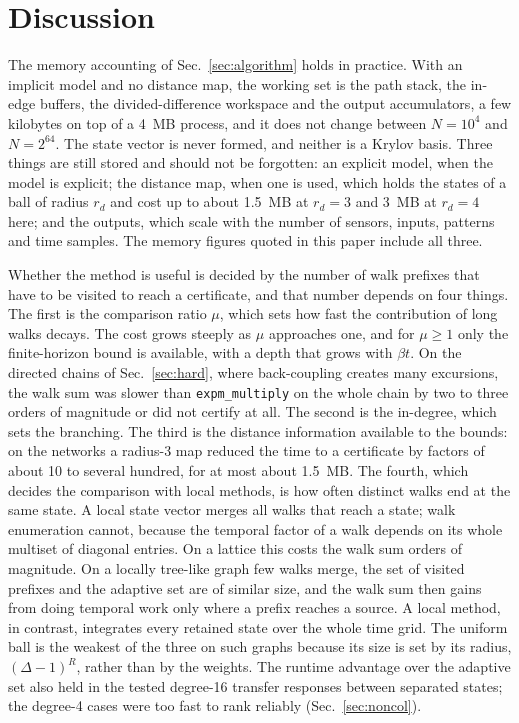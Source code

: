 \documentclass[aps,pra,superscriptaddress,floatfix,longbibliography,twocolumn]{revtex4-2}
\begin{document}
\section{Discussion}\label{sec:discussion}

The memory accounting of Sec.~\ref{sec:algorithm} holds in practice. With an implicit model and no distance map, the working set is the path stack, the in-edge buffers, the divided-difference workspace and the output accumulators, a few kilobytes on top of a 4~MB process, and it does not change between $N=10^4$ and $N=2^{64}$. The state vector is never formed, and neither is a Krylov basis. Three things are still stored and should not be forgotten: an explicit model, when the model is explicit; the distance map, when one is used, which holds the states of a ball of radius $r_d$ and cost up to about 1.5~MB at $r_d=3$ and 3~MB at $r_d=4$ here; and the outputs, which scale with the number of sensors, inputs, patterns and time samples. The memory figures quoted in this paper include all three.

Whether the method is useful is decided by the number of walk prefixes that have to be visited to reach a certificate, and that number depends on four things. The first is the comparison ratio $\mu$, which sets how fast the contribution of long walks decays. The cost grows steeply as $\mu$ approaches one, and for $\mu\ge1$ only the finite-horizon bound is available, with a depth that grows with $\beta t$. On the directed chains of Sec.~\ref{sec:hard}, where back-coupling creates many excursions, the walk sum was slower than \texttt{expm\_multiply} on the whole chain by two to three orders of magnitude or did not certify at all. The second is the in-degree, which sets the branching. The third is the distance information available to the bounds: on the networks a radius-3 map reduced the time to a certificate by factors of about 10 to several hundred, for at most about 1.5~MB. The fourth, which decides the comparison with local methods, is how often distinct walks end at the same state. A local state vector merges all walks that reach a state; walk enumeration cannot, because the temporal factor of a walk depends on its whole multiset of diagonal entries. On a lattice this costs the walk sum orders of magnitude. On a locally tree-like graph few walks merge, the set of visited prefixes and the adaptive set are of similar size, and the walk sum then gains from doing temporal work only where a prefix reaches a source. A local method, in contrast, integrates every retained state over the whole time grid. The uniform ball is the weakest of the three on such graphs because its size is set by its radius, $(\Delta-1)^R$, rather than by the weights. The runtime advantage over the adaptive set also held in the tested degree-16 transfer responses between separated states; the degree-4 cases were too fast to rank reliably (Sec.~\ref{sec:noncol}).
\end{document}
